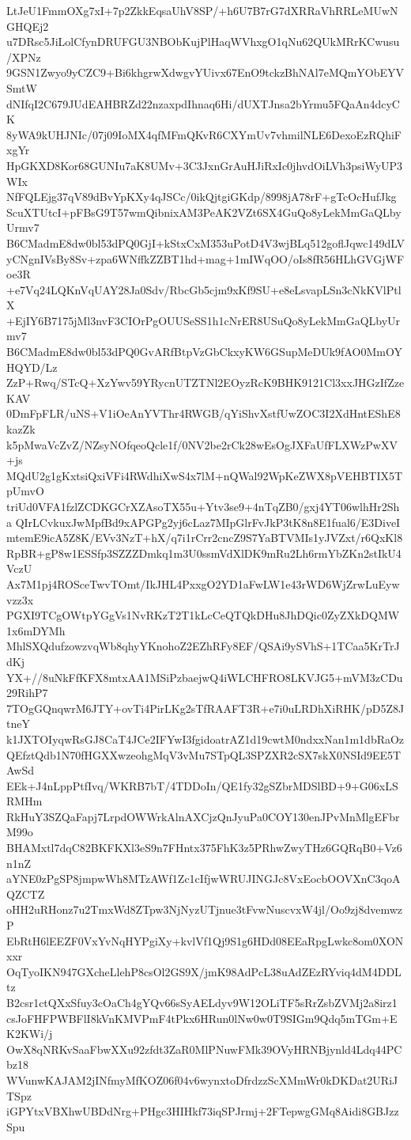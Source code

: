 LtJeU1FmmOXg7xI+7p2ZkkEqsaUhV8SP/+h6U7B7rG7dXRRaVhRRLeMUwNGHQEj2
u7DRsc5JiLolCfynDRUFGU3NBObKujPlHaqWVhxgO1qNu62QUkMRrKCwusu/XPNz
9GSN1Zwyo9yCZC9+Bi6khgrwXdwgvYUivx67EnO9tckzBhNAl7eMQmYObEYVSmtW
dNIfqI2C679JUdEAHBRZd22nzaxpdIhnaq6Hi/dUXTJnsa2bYrmu5FQaAn4dcyCK
8yWA9kUHJNIc/07j09IoMX4qfMFmQKvR6CXYmUv7vhmilNLE6DexoEzRQhiFxgYr
HpGKXD8Kor68GUNIu7aK8UMv+3C3JxnGrAuHJiRxIc0jhvdOiLVh3psiWyUP3WIx
NfFQLEjg37qV89dBvYpKXy4qJSCc/0ikQjtgiGKdp/8998jA78rF+gTcOcHufJkg
ScuXTUtcI+pFBsG9T57wmQibnixAM3PeAK2VZt6SX4GuQo8yLekMmGaQLbyUrmv7
B6CMadmE8dw0bl53dPQ0GjI+kStxCxM353uPotD4V3wjBLq512goflJqwc149dLV
yCNgnIVsBy8Sv+zpa6WNffkZZBT1hd+mag+1mIWqOO/oIs8fR56HLhGVGjWFoe3R
+e7Vq24LQKnVqUAY28Ja0Sdv/RbcGb5cjm9xKf9SU+e8eLsvapLSn3cNkKVlPtlX
+EjIY6B7175jMl3nvF3CIOrPgOUUSeSS1h1cNrER8USuQo8yLekMmGaQLbyUrmv7
B6CMadmE8dw0bl53dPQ0GvARfBtpVzGbCkxyKW6GSupMeDUk9fAO0MmOYHQYD/Lz
ZzP+Rwq/STcQ+XzYwv59YRycnUTZTNl2EOyzRcK9BHK9121Cl3xxJHGzIfZzeKAV
0DmFpFLR/uNS+V1iOeAnYVThr4RWGB/qYiShvXstfUwZOC3I2XdHntEShE8kazZk
k5pMwaVcZvZ/NZsyNOfqeoQcle1f/0NV2be2rCk28wEsOgJXFaUfFLXWzPwXV+js
MQdU2g1gKxtsiQxiVFi4RWdhiXwS4x7lM+nQWal92WpKeZWX8pVEHBTIX5TpUmvO
triUd0VFA1fzlZCDKGCrXZAsoTX55u+Ytv3se9+4nTqZB0/gxj4YT06wlhHr2Sha
QIrLCvkuxJwMpfBd9xAPGPg2yj6cLaz7MIpGlrFvJkP3tK8n8E1fual6/E3DiveI
mtemE9icA5Z8K/EVv3NzT+hX/q7i1rCrr2cncZ9S7YaBTVMIs1yJVZxt/r6QxKl8
RpBR+gP8w1ESSfp3SZZZDmkq1m3U0ssmVdXlDK9mRu2Lh6rmYbZKn2stIkU4VczU
Ax7M1pj4ROSceTwvTOmt/IkJHL4PxxgO2YD1aFwLW1e43rWD6WjZrwLuEywvzz3x
PGXI9TCgOWtpYGgVs1NvRKzT2T1kLcCeQTQkDHu8JhDQic0ZyZXkDQMW1x6mDYMh
MhlSXQdufzowzvqWb8qhyYKnohoZ2EZhRFy8EF/QSAi9ySVhS+1TCaa5KrTrJdKj
YX+//8uNkFfKFX8mtxAA1MSiPzbaejwQ4iWLCHFRO8LKVJG5+mVM3zCDu29RihP7
7TOgGQnqwrM6JTY+ovTi4PirLKg2sTfRAAFT3R+e7i0uLRDhXiRHK/pD5Z8JtneY
k1JXTOIyqwRsGJ8CaT4JCe2IFYwI3fgidoatrAZ1d19cwtM0ndxxNan1m1dbRaOz
QEfztQdb1N70fHGXXwzeohgMqV3vMu7STpQL3SPZXR2cSX7skX0NSId9EE5TAwSd
EEk+J4nLppPtfIvq/WKRB7bT/4TDDoIn/QE1fy32gSZbrMDSlBD+9+G06xLSRMHm
RkHuY3SZQaFapj7LrpdOWWrkAlnAXCjzQnJyuPa0COY130enJPvMnMlgEFbrM99o
BHAMxtl7dqC82BKFKXl3eS9n7FHntx375FhK3z5PRhwZwyTHz6GQRqB0+Vz6n1nZ
aYNE0zPgSP8jmpwWh8MTzAWf1Zc1cIfjwWRUJINGJc8VxEocbOOVXnC3qoAQZCTZ
oHH2uRHonz7u2TmxWd8ZTpw3NjNyzUTjnue3tFvwNuscvxW4jl/Oo9zj8dvemwzP
EbRtH6lEEZF0VxYvNqHYPgiXy+kvlVf1Qj9S1g6HDd08EEaRpgLwkc8om0XONxxr
OqTyoIKN947GXcheLlehP8csOl2GS9X/jmK98AdPcL38uAdZEzRYviq4dM4DDLtz
B2csr1ctQXxSfuy3cOaCh4gYQv66sSyAELdyv9W12OLiTF5sRrZsbZVMj2a8irz1
csJoFHFPWBFlI8kVnKMVPmF4tPkx6HRun0lNw0w0T9SIGm9Qdq5mTGm+EK2KWi/j
OwX8qNRKvSaaFbwXXu92zfdt3ZaR0MlPNuwFMk39OVyHRNBjynld4Ldq44PCbz18
WVunwKAJAM2jINfmyMfKOZ06f04v6wynxtoDfrdzzScXMmWr0kDKDat2URiJTSpz
iGPYtxVBXhwUBDdNrg+PHgc3HIHkf73iqSPJrmj+2FTepwgGMq8Aidi8GBJzzSpu
